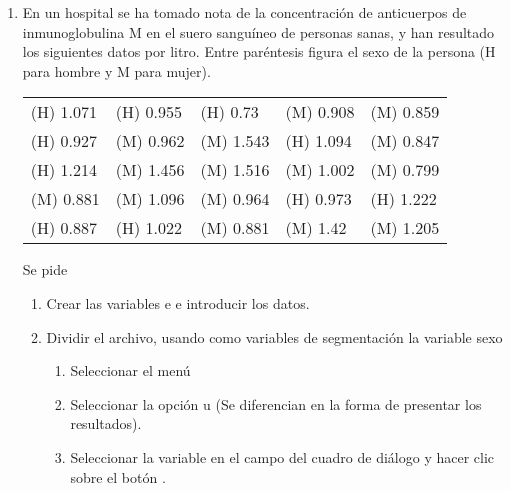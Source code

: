 \begin{enumerate}[leftmargin=*]
\item  En un hospital se ha tomado nota de la concentración de
anticuerpos de inmunoglobulina M en el suero sanguíneo de
personas sanas, y han resultado los siguientes datos por litro.
Entre paréntesis figura el sexo de la persona (H para hombre y
M para mujer).
\begin{center}
\begin{tabular}{lllll}
(H) 1.071 & (H) 0.955 & (H) 0.73 & (M) 0.908 & (M) 0.859  \\
(H) 0.927 & (M) 0.962 & (M) 1.543 & (H) 1.094 & (M) 0.847  \\
(H) 1.214 & (M) 1.456 & (M) 1.516 & (M) 1.002 & (M) 0.799  \\
(M) 0.881 & (M) 1.096 & (M) 0.964 & (H) 0.973 & (H) 1.222  \\
(H) 0.887 & (H) 1.022 & (M) 0.881 & (M) 1.42 & (M) 1.205  \\
\end{tabular}
\end{center}
Se pide
\begin{enumerate}
\item  Crear las variables  e  e introducir los datos.
\item  Dividir el archivo, usando como variables de segmentación la variable sexo
\begin{indicacion}
\begin{enumerate}
\item Seleccionar el menú  
\item Seleccionar la opción  u
 (Se diferencian en la
forma de presentar los resultados).
\item Seleccionar la variable  en el campo  del cuadro
de diálogo y hacer clic sobre el botón .
\end{enumerate}
\end{indicacion}


\end{enumerate}
\end{enumerate}
